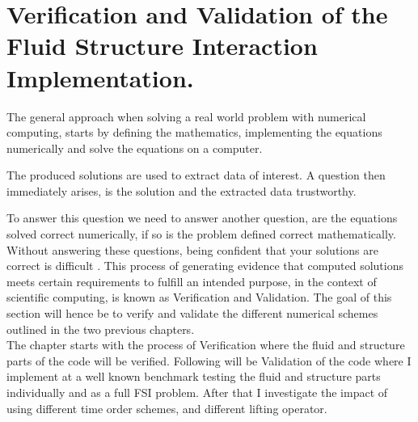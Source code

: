 \chapter{Verification and Validation of the Fluid Structure Interaction Implementation.}
The general approach when solving a real world problem with numerical computing, starts by defining the mathematics, implementing the equations numerically and solve the equations on a computer. 

The produced solutions are used to extract data of interest. A question then immediately arises, is the solution and the extracted data trustworthy.

To answer this question we need to answer another question, are the equations solved correct numerically, if so is the problem defined correct mathematically.
Without answering these questions, being confident that your solutions are correct is difficult \cite{Selin2014}. This process of generating evidence that computed solutions meets certain requirements to fulfill an intended purpose, in the context of scientific computing, is known as Verification and Validation. The goal of this section will hence be to verify and validate the different numerical schemes outlined in the two previous chapters.  \\

The chapter starts with the process of Verification where the fluid and structure parts of the code will be verified. Following will be Validation of the code where I implement at a well known benchmark testing the fluid and structure parts individually and as a full FSI problem. After that I investigate the impact of using different time order schemes, and different lifting operator.\newline

\begin{comment}
We start with Verification, which is the process of assessing numerical correctness and accuracy of a computed solution. Then comes Validation, which is assessing physical accuracy of the numerical model, a process which is done by comparing numerical simulation with experimental data. In simple terms we check that we are solving the equations right and then that we are solving the right equations. The process of Verification has to always come before Validation. Because there is no need in checking if we are using the right equations if the equations are not solved right. 
\end{comment}

